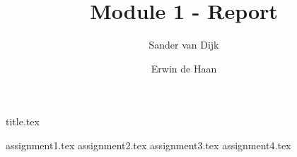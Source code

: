 \documentclass[final]{scrreprt} %
\title{Module 1 - Report}
\author{Sander {van Dijk} \and Erwin {de Haan}}
\begin{document}

{title.tex}

\newpage

\tableofcontents

\newpage
{}
{assignment1.tex}
{assignment2.tex}
{assignment3.tex}
{assignment4.tex}
\newpage
{}

\printbibliography
\end{document}
